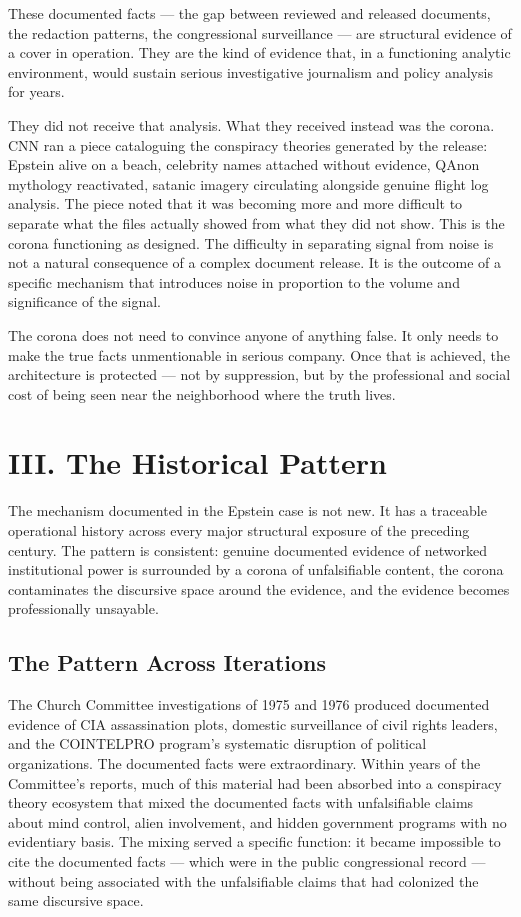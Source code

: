 \documentclass[11pt,a4paper]{article}
\begin{document}
These documented facts — the gap between reviewed and released documents, the redaction patterns, the congressional surveillance — are structural evidence of a cover in operation. They are the kind of evidence that, in a functioning analytic environment, would sustain serious investigative journalism and policy analysis for years.


They did not receive that analysis. What they received instead was the corona. CNN ran a piece cataloguing the conspiracy theories generated by the release: Epstein alive on a beach, celebrity names attached without evidence, QAnon mythology reactivated, satanic imagery circulating alongside genuine flight log analysis. The piece noted that it was becoming more and more difficult to separate what the files actually showed from what they did not show. This is the corona functioning as designed. The difficulty in separating signal from noise is not a natural consequence of a complex document release. It is the outcome of a specific mechanism that introduces noise in proportion to the volume and significance of the signal.


The corona does not need to convince anyone of anything false. It only needs to make the true facts unmentionable in serious company. Once that is achieved, the architecture is protected — not by suppression, but by the professional and social cost of being seen near the neighborhood where the truth lives.


\section{III. The Historical Pattern}

The mechanism documented in the Epstein case is not new. It has a traceable operational history across every major structural exposure of the preceding century. The pattern is consistent: genuine documented evidence of networked institutional power is surrounded by a corona of unfalsifiable content, the corona contaminates the discursive space around the evidence, and the evidence becomes professionally unsayable.


\subsection{The Pattern Across Iterations}

The Church Committee investigations of 1975 and 1976 produced documented evidence of CIA assassination plots, domestic surveillance of civil rights leaders, and the COINTELPRO program's systematic disruption of political organizations. The documented facts were extraordinary. Within years of the Committee's reports, much of this material had been absorbed into a conspiracy theory ecosystem that mixed the documented facts with unfalsifiable claims about mind control, alien involvement, and hidden government programs with no evidentiary basis. The mixing served a specific function: it became impossible to cite the documented facts — which were in the public congressional record — without being associated with the unfalsifiable claims that had colonized the same discursive space.
\end{document}
